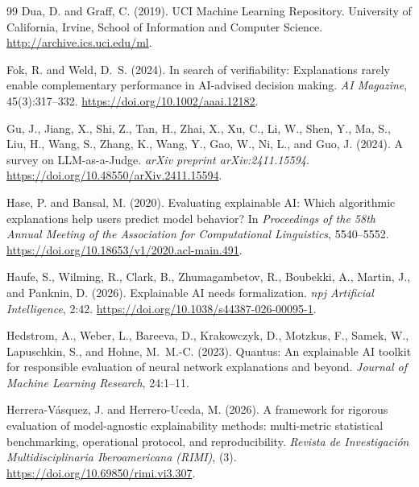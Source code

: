 \documentclass[10pt]{article}
\begin{document}
\begin{thebibliography}{99}
Dua, D. and Graff, C. (2019).
{UCI} Machine Learning Repository.
University of California, Irvine, School of Information and Computer Science.
\url{http://archive.ics.uci.edu/ml}.

Fok, R. and Weld, D.~S. (2024).
In search of verifiability: Explanations rarely enable complementary
performance in AI-advised decision making.
\emph{AI Magazine}, 45(3):317--332.
\url{https://doi.org/10.1002/aaai.12182}.

Gu, J., Jiang, X., Shi, Z., Tan, H., Zhai, X., Xu, C., Li, W., Shen, Y.,
Ma, S., Liu, H., Wang, S., Zhang, K., Wang, Y., Gao, W., Ni, L., and
Guo, J. (2024).
A survey on LLM-as-a-Judge.
\emph{arXiv preprint arXiv:2411.15594}.
\url{https://doi.org/10.48550/arXiv.2411.15594}.

Hase, P. and Bansal, M. (2020).
Evaluating explainable {AI}: Which algorithmic explanations help users
predict model behavior?
In \emph{Proceedings of the 58th Annual Meeting of the Association for
Computational Linguistics}, 5540--5552.
\url{https://doi.org/10.18653/v1/2020.acl-main.491}.

Haufe, S., Wilming, R., Clark, B., Zhumagambetov, R., Boubekki, A.,
Martin, J., and Panknin, D. (2026).
Explainable {AI} needs formalization.
\emph{npj Artificial Intelligence}, 2:42.
\url{https://doi.org/10.1038/s44387-026-00095-1}.

Hedstrom, A., Weber, L., Bareeva, D., Krakowczyk, D., Motzkus, F.,
Samek, W., Lapuschkin, S., and Hohne, M.~M.-C. (2023).
Quantus: An explainable AI toolkit for responsible evaluation of neural
network explanations and beyond.
\emph{Journal of Machine Learning Research}, 24:1--11.

Herrera-V\'asquez, J. and Herrero-Uceda, M. (2026).
A framework for rigorous evaluation of model-agnostic explainability
methods: multi-metric statistical benchmarking, operational protocol, and
reproducibility.
\emph{Revista de Investigaci\'on Multidisciplinaria Iberoamericana (RIMI)},
(3).
\url{https://doi.org/10.69850/rimi.vi3.307}.


\end{thebibliography}
\end{document}
